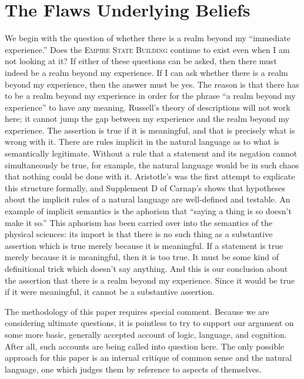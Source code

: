 \chapter{The Flaws Underlying Beliefs}

We begin with the question of whether there is a realm beyond my 
\enquote{immediate experience.} Does the \textsc{Empire State Building} continue to exist 
even when I am not looking at it? If either of these questions can be asked, 
then there must indeed be a realm beyond my experience. If I can ask 
whether there is a realm beyond my experience, then the answer must be 
yes. The reason is that there has to be a realm beyond my experience in 
order for the phrase \enquote{a realm beyond my experience} to have any meaning. 
Russell's theory of descriptions will not work here; it cannot jump the gap 
between my experience and the realm beyond my experience. The assertion 
 is true if it is meaningful, and that 
is precisely what is wrong with it. There are rules implicit in the natural 
language as to what is semantically legitimate. Without a rule that a 
statement and its negation cannot simultaneously be true, for example, the 
natural language would be in such chaos that nothing could be done with it. 
Aristotle's  was the first attempt to explicate this structure formally, 
and Supplement D of Carnap's  shows that hypotheses 
about the implicit rules of a natural language are well-defined and testable. 
An example of implicit semantics is the aphorism that \enquote{saying a thing is so 
doesn't make it so.} This aphorism has been carried over into the semantics 
of the physical sciences: its import is that there is no such thing as a 
substantive assertion which is true merely because it is meaningful. If a 
statement is true merely because it is meaningful, then it is too true. It must 
be some kind of definitional trick which doesn't say anything. And this is 
our conclusion about the assertion that there is a realm beyond my 
experience. Since it would be true if it were meaningful, it cannot be a 
substantive assertion. 

The methodology of this paper requires special comment. Because we 
are considering ultimate questions, it is pointless to try to support our 
argument on some more basic, generally accepted account of logic, language, 
and cognition. After all, such accounts are being called into question here. 
The only possible approach for this paper is an internal critique of common 
sense and the natural language, one which judges them by reference to 
aspects of themselves. 

